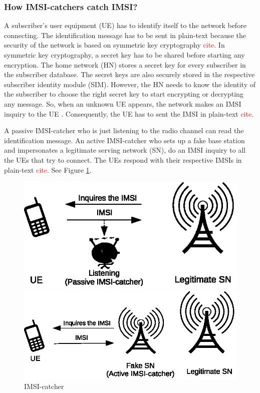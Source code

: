 \documentclass{llncs} %
\begin{document}
\subsubsection{How IMSI-catchers catch IMSI?} A subscriber's user equipment (UE) has to identify itself to the network before connecting. The identification message has to be sent in plain-text because the security of the network is based on symmetric key cryptography \textcolor{red}{cite}. In symmetric key cryptography, a secret key has to be shared before starting any encryption. The home network (HN) stores a secret key for every subscriber in the subscriber database. The secret keys are also securely stored in the respective subscriber identity module (SIM). However, the HN needs to know the identity of the subscriber to choose the right secret key to start encrypting or decrypting any message. So, when an unknown UE appears, the network makes an IMSI inquiry to the UE . Consequently, the UE has to sent the IMSI in plain-text \textcolor{red}{cite}. 

A passive IMSI-catcher who is just listening to the radio channel can read the identification message. An active IMSI-catcher who sets up a fake base station and impersonates a legitimate serving network (SN), do an IMSI inquiry to all the UEs that try to connect. The UEs respond with their respective IMSIs in plain-text \textcolor{red}{cite}. See Figure \ref{fig:IMSI-catching}. 

\begin{figure}[!tbp]
  \centering
  \begin{minipage}[b]{0.4\textwidth}
    \includegraphics[width=\textwidth]{Passive_IMSI-Catcher.eps}
  \end{minipage}
  \hfill
  \begin{minipage}[b]{0.57\textwidth}
    \includegraphics[width=\textwidth]{Active-IMSI-Cactcher.eps}
  \end{minipage}
  \caption{IMSI-catcher}
  \label{fig:IMSI-catching}
\end{figure}
\end{document}
